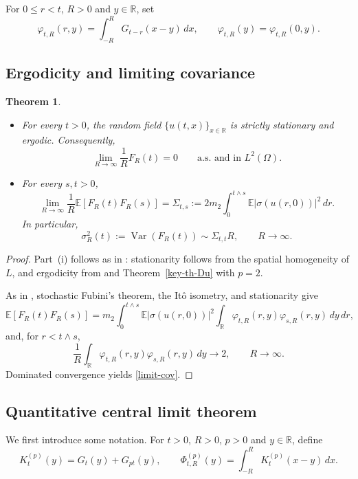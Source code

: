 \documentclass[10pt,a4paper]{amsart}
\newtheorem{theorem}{Theorem}[section]
\def\bE{\mathbb{E}}
\def\bR{\mathbb{R}}
\begin{document}
For $0\le r<t$, $R>0$ and $y\in\bR$, set
\begin{equation}
\label{def-phi}
\varphi_{t,R}(r,y)
=
\int_{-R}^{R}G_{t-r}(x-y)\,dx,
\qquad
\varphi_{t,R}(y)=\varphi_{t,R}(0,y).
\end{equation}

\subsection{Ergodicity and limiting covariance}
\begin{theorem}
\label{ergodic-cov}
\begin{itemize}
\item[(i)] For every $t>0$, the random field $\{u(t,x)\}_{x\in\bR}$ is
strictly stationary and ergodic. Consequently,
\[
\lim_{R\to\infty}\frac{1}{R}F_R(t)=0
\qquad
\text{a.s. and in }L^2(\Omega).
\]

\item[(ii)] For every $s,t>0$,
\begin{equation}
\label{limit-cov}
\lim_{R\to\infty}
\frac{1}{R}\bE[F_R(t)F_R(s)]
=
\Sigma_{t,s}
:=
2m_2\int_0^{t\wedge s}
\bE\big|\sigma(u(r,0))\big|^2\,dr.
\end{equation}
In particular,
\[
\sigma_R^2(t):=\operatorname{Var}(F_R(t))
\sim
\Sigma_{t,t}R,
\qquad R\to\infty.
\]
\end{itemize}
\end{theorem}

\begin{proof}
 Part~(i) follows as in \cite[Theorem~1.1]{BZ24}: stationarity follows
from the spatial homogeneity of $L$, and ergodicity from
\cite[Lemma~4.2]{BZ24} and Theorem~\ref{key-th-Du} with $p=2$.

As in \cite[proof of Theorem~1.1(ii)]{BLW26}, stochastic Fubini's
theorem, the It\^o isometry, and stationarity give
\[
\bE[F_R(t)F_R(s)]
=
m_2\int_0^{t\wedge s}
\bE|\sigma(u(r,0))|^2
\int_{\bR}
\varphi_{t,R}(r,y)\varphi_{s,R}(r,y)\,dy\,dr,
\]
 and, for $r<t\wedge s$,
\[
\frac1R\int_{\bR}
\varphi_{t,R}(r,y)\varphi_{s,R}(r,y)\,dy
\longrightarrow 2,
\qquad R\to\infty.
\]
Dominated convergence yields \eqref{limit-cov}.
\end{proof}

\subsection{Quantitative central limit theorem}
We first introduce some notation. For \(t>0\), \(R>0\),
\(p>0\) and \(y\in\bR\), define
\[
K_t^{(p)}(y)
=
G_t(y)+G_{pt}(y),
\qquad
\Phi_{t,R}^{(p)}(y)
=
\int_{-R}^{R}K_t^{(p)}(x-y)\,dx .
\]
\end{document}
